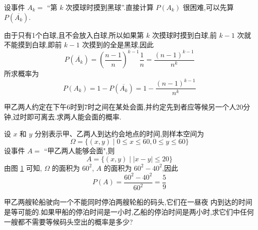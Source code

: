 \begin{solution}
    设事件 $A_k=$ ``第 $k$ 次摸球时摸到黑球''.直接计算 $P(A_k)$ 很困难,可以先算 $P(\overline{A_k})$.
    
    由于只有1个白球,且不会放入白球,所以如果第 $k$ 次摸球时摸到白球,前 $k-1$ 次就不能摸到白球,即前 $k-1$ 次摸到的全是黑球,因此
    $$
    P(\overline{A_k}) = \left( \dfrac{n-1}{n} \right)^{k-1} \dfrac{1}{n} = \dfrac{(n-1)^{k-1}}{n^k}
    $$
    所求概率为
    $$
    P(A_k) = 1 - P(\overline{A_k}) = 1 - \dfrac{(n-1)^{k-1}}{n^k}
    $$
\end{solution}


\question[会面问题] 甲乙两人约定在下午6时到7时之间在某处会面,并约定先到者应等候另一个人20分钟,过时即可离去.求两人能会面的概率.

\begin{solution}
    设 $x$ 和 $y$ 分别表示甲、乙两人到达约会地点的时间,则样本空间为
    $$
    \varOmega = \{ (x,y) \mid 0 \leqslant x \leqslant 60, 0 \leqslant y \leqslant 60 \}
    $$
    设事件 $A=$ ``甲乙两人能够会面",则
    $$
    A = \{ (x,y) \mid |x-y| \leqslant 20 \}
    $$
    由图 \ref{fig:会面问题} 可知, $\varOmega$ 的面积为 $60^2$, $A$ 的面积为 $60^2 - 40^2$,因此
    $$
    P(A) = \dfrac{60^2 - 40^2}{60^2} = \dfrac{5}{9}
    $$

    \begin{figure}[H]
        \centering


        \caption{}
        \label{fig:会面问题}
    \end{figure}
\end{solution}

\question 甲乙两艘轮船驶向一个不能同时停泊两艘轮船的码头,它们在一昼夜  内到达的时间是等可能的.如果甲船的停泊时间是一小时,乙船的停泊时间是两小时,求它们中任何一艘都不需要等候码头空出的概率是多少?

